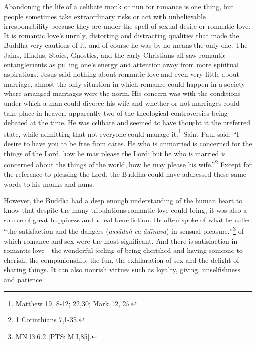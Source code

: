 \documentclass[10pt, openright]{book}
\begin{document}
Abandoning the life of a celibate monk or nun for romance is one thing, but people sometimes take extraordinary risks or act with unbelievable irresponsibility because they are under the spell of sexual desire or romantic love. It is romantic love’s unruly, distorting and distracting qualities that made the Buddha very cautious of it, and of course he was by no means the only one. The Jains, Hindus, Stoics, Gnostics, and the early Christians all saw romantic entanglements as pulling one’s energy and attention away from more spiritual aspirations. Jesus said nothing about romantic love and even very little about marriage, almost the only situation in which romance could happen in a society where arranged marriages were the norm. His concern was with the conditions under which a man could divorce his wife and whether or not marriages could take place in heaven, apparently two of the theological controversies being debated at the time. He was celibate and seemed to have thought it the preferred state, while admitting that not everyone could manage it.\footnote {Matthew 19, 8-12; 22,30; Mark 12, 25.} Saint Paul said: “I desire to have you to be free from cares. He who is unmarried is concerned for the things of the Lord, how he may please the Lord; but he who is married is concerned about the things of the world, how he may please his wife.”\footnote {1 Corinthians 7,1-35.} Except for the reference to pleasing the Lord, the Buddha could have addressed these same words to his monks and nuns.


However, the Buddha had a deep enough understanding of the human heart to know that despite the many tribulations romantic love could bring, it was also a source of great happiness and a real benediction. He often spoke of what he called “the satisfaction and the dangers (\textit{assādañ} \textit{ca} \textit{ādīnava}) in sensual pleasure,”\footnote {\href{https://suttacentral.net/mn13/en/sujato\#6.2}{MN 13:6.2} [PTS: M.I,85].} of which romance and sex were the most significant. And there is satisfaction in romantic love—the wonderful feeling of being cherished and having someone to cherish, the companionship, the fun, the exhilaration of sex and the delight of sharing things. It can also nourish virtues such as loyalty, giving, unselfishness and patience.
\end{document}
